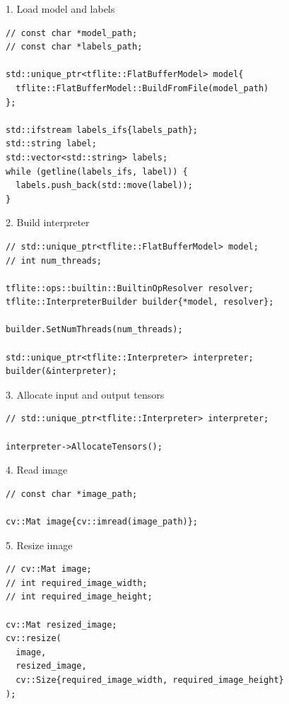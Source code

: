 \begin{frame}[fragile]{1. Load model and labels}
  \lstset{basicstyle=\ttfamily\small, numbers=left, columns=fullflexible}
  \begin{lstlisting}
// const char *model_path;
// const char *labels_path;

std::unique_ptr<tflite::FlatBufferModel> model{
  tflite::FlatBufferModel::BuildFromFile(model_path)
};

std::ifstream labels_ifs{labels_path};
std::string label;
std::vector<std::string> labels;
while (getline(labels_ifs, label)) {
  labels.push_back(std::move(label));
}

  \end{lstlisting}
\end{frame}

\begin{frame}[fragile]{2. Build interpreter}
  \lstset{basicstyle=\ttfamily\small, numbers=left, columns=fullflexible}
  \begin{lstlisting}
// std::unique_ptr<tflite::FlatBufferModel> model;
// int num_threads;

tflite::ops::builtin::BuiltinOpResolver resolver;
tflite::InterpreterBuilder builder{*model, resolver};

builder.SetNumThreads(num_threads);

std::unique_ptr<tflite::Interpreter> interpreter;
builder(&interpreter);
  \end{lstlisting}
\end{frame}

\begin{frame}[fragile]{3. Allocate input and output tensors}
  \lstset{basicstyle=\ttfamily\small, numbers=left, columns=fullflexible}
  \begin{lstlisting}
// std::unique_ptr<tflite::Interpreter> interpreter;

interpreter->AllocateTensors();
  \end{lstlisting}
\end{frame}

\begin{frame}[fragile]{4. Read image}
  \lstset{basicstyle=\ttfamily\small, numbers=left, columns=fullflexible}
  \begin{lstlisting}
// const char *image_path;

cv::Mat image{cv::imread(image_path)};
  \end{lstlisting}
\end{frame}

\begin{frame}[fragile]{5. Resize image}
  \lstset{basicstyle=\ttfamily\small, numbers=left, columns=fullflexible}
  \begin{lstlisting}
// cv::Mat image;
// int required_image_width;
// int required_image_height;

cv::Mat resized_image;
cv::resize(
  image,
  resized_image,
  cv::Size{required_image_width, required_image_height}
);
  \end{lstlisting}
\end{frame}

